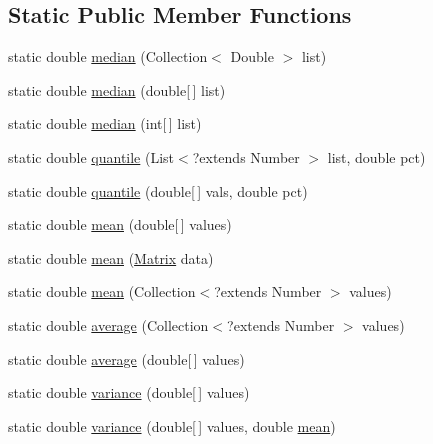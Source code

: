 \subsection*{Static Public Member Functions}
\begin{DoxyCompactItemize}
\item 
static double \hyperlink{classbroad_1_1core_1_1math_1_1_statistics_a05c6413d133a3caf4644c83d8685996a}{median} (Collection$<$ Double $>$ list)
\item 
static double \hyperlink{classbroad_1_1core_1_1math_1_1_statistics_adb8cf9a05ac40be990320cdbd734935b}{median} (double\mbox{[}$\,$\mbox{]} list)
\item 
static double \hyperlink{classbroad_1_1core_1_1math_1_1_statistics_a9399a1ce85946161345043295d50e594}{median} (int\mbox{[}$\,$\mbox{]} list)
\item 
static double \hyperlink{classbroad_1_1core_1_1math_1_1_statistics_a5f80bf496be7cb6f072b16b52b6560ac}{quantile} (List$<$?extends Number $>$ list, double pct)
\item 
static double \hyperlink{classbroad_1_1core_1_1math_1_1_statistics_a2093930f08383c26d93437ebb3ec244a}{quantile} (double\mbox{[}$\,$\mbox{]} vals, double pct)
\item 
static double \hyperlink{classbroad_1_1core_1_1math_1_1_statistics_a6cee05563e8d7390baaf1248fddc8596}{mean} (double\mbox{[}$\,$\mbox{]} values)
\item 
static double \hyperlink{classbroad_1_1core_1_1math_1_1_statistics_a6f3b8688833d761584113c9d1e70fc57}{mean} (\hyperlink{class_jama_1_1_matrix}{Matrix} data)
\item 
static double \hyperlink{classbroad_1_1core_1_1math_1_1_statistics_ae957919cccebdf08b9fecf8ef16b4d66}{mean} (Collection$<$?extends Number $>$ values)
\item 
static double \hyperlink{classbroad_1_1core_1_1math_1_1_statistics_abafc7a9389cb75cda5439655f6a99e32}{average} (Collection$<$?extends Number $>$ values)
\item 
static double \hyperlink{classbroad_1_1core_1_1math_1_1_statistics_a97dd87a98107c0530294426c651b8e79}{average} (double\mbox{[}$\,$\mbox{]} values)
\item 
static double \hyperlink{classbroad_1_1core_1_1math_1_1_statistics_a99743455771861e891a42d5e82eca0ff}{variance} (double\mbox{[}$\,$\mbox{]} values)
\item 
static double \hyperlink{classbroad_1_1core_1_1math_1_1_statistics_a364dc3f74491cfd8a4c4c8597e8c76af}{variance} (double\mbox{[}$\,$\mbox{]} values, double \hyperlink{classbroad_1_1core_1_1math_1_1_statistics_a6cee05563e8d7390baaf1248fddc8596}{mean})

\end{DoxyCompactItemize}
